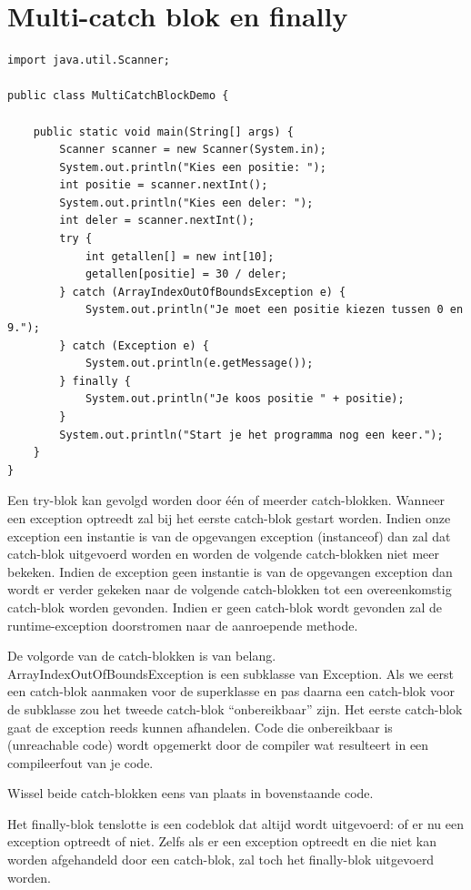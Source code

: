 \section{Multi-catch blok en finally}

\begin{lstlisting}
import java.util.Scanner;

public class MultiCatchBlockDemo {

	public static void main(String[] args) {
		Scanner scanner = new Scanner(System.in);
		System.out.println("Kies een positie: ");
		int positie = scanner.nextInt();
		System.out.println("Kies een deler: ");
		int deler = scanner.nextInt();
		try {
			int getallen[] = new int[10];
			getallen[positie] = 30 / deler;
		} catch (ArrayIndexOutOfBoundsException e) {
			System.out.println("Je moet een positie kiezen tussen 0 en 9.");
		} catch (Exception e) {
			System.out.println(e.getMessage());
		} finally {
			System.out.println("Je koos positie " + positie);
		}
		System.out.println("Start je het programma nog een keer.");
	}
}
\end{lstlisting}

Een try-blok kan gevolgd worden door \'e\'en of meerder catch-blokken.
Wanneer een exception optreedt zal bij het eerste catch-blok gestart worden. Indien onze exception een instantie is van de opgevangen exception  (instanceof) dan zal dat catch-blok uitgevoerd worden en worden de volgende catch-blokken niet meer bekeken. Indien de exception geen instantie is van de opgevangen exception dan wordt er verder gekeken naar de volgende catch-blokken tot een overeenkomstig catch-blok worden gevonden. Indien er geen catch-blok wordt gevonden zal de runtime-exception doorstromen naar de aanroepende methode.

De volgorde van de catch-blokken is van belang. ArrayIndexOutOfBoundsException is een subklasse van Exception. Als we eerst een catch-blok aanmaken voor de superklasse en pas daarna een catch-blok voor de subklasse zou het tweede catch-blok ``onbereikbaar'' zijn. Het eerste catch-blok gaat de exception reeds kunnen afhandelen. Code die onbereikbaar is (unreachable code) wordt opgemerkt door de compiler wat resulteert in een compileerfout van je code.

\begin{oefening}
Wissel beide catch-blokken eens van plaats in bovenstaande code.
\end{oefening}

Het finally-blok tenslotte is een codeblok dat altijd wordt uitgevoerd: of er nu een exception optreedt of niet. Zelfs als er een exception optreedt en die niet kan worden afgehandeld door een catch-blok, zal toch het finally-blok uitgevoerd worden.

